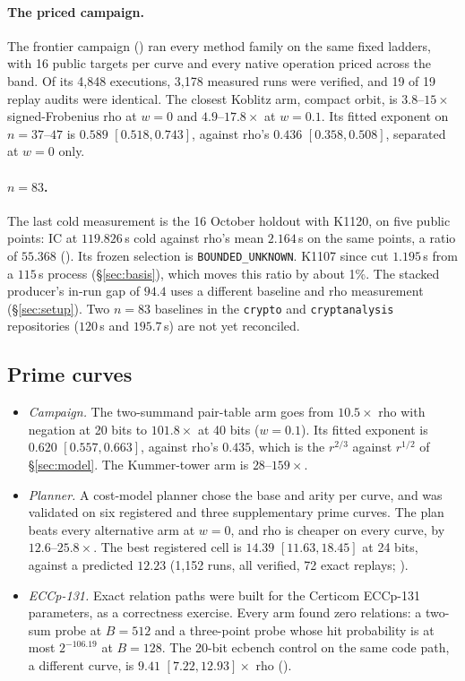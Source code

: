 \paragraph{The priced campaign.} The frontier campaign
() ran every method family on
the same fixed ladders, with 16 public targets per curve and every native
operation priced across the band. Of its 4{,}848 executions, 3{,}178
measured runs were verified, and 19 of 19 replay audits were identical. The
closest Koblitz arm, compact orbit, is $3.8$--$15\times$ signed-Frobenius
rho at $w=0$ and $4.9$--$17.8\times$ at $w=0.1$. Its fitted exponent on
$n=37$--$47$ is $0.589$ $[0.518,0.743]$, against rho's $0.436$
$[0.358,0.508]$, separated at $w=0$ only.

\paragraph{$n=83$.} The last cold measurement is the 16 October holdout
with K1120, on five public points: IC at $119.826$\,s cold against
rho's mean $2.164$\,s on the same points, a ratio of
$55.368$ (). Its frozen
selection is \texttt{BOUNDED\_UNKNOWN}. K1107 since cut $1.195$\,s from a
$115$\,s process (\S\ref{sec:basis}), which moves this ratio by about 1\%.
The stacked producer's in-run gap of $94.4$ uses a different baseline and
rho measurement (\S\ref{sec:setup}). Two $n=83$ baselines in the
\texttt{crypto} and \texttt{cryptanalysis} repositories ($120$\,s and
$195.7$\,s) are not yet reconciled.

\subsection{Prime curves}

\begin{itemize}
\item \emph{Campaign.} The two-summand pair-table arm goes from $10.5\times$
  rho with negation at 20 bits to $101.8\times$ at 40 bits ($w=0.1$). Its
  fitted exponent is $0.620$ $[0.557,0.663]$, against rho's $0.435$, which
  is the $r^{2/3}$ against $r^{1/2}$ of \S\ref{sec:model}. The Kummer-tower
  arm is $28$--$159\times$.
\item \emph{Planner.} A cost-model planner chose the base and arity per
  curve, and was validated on six registered and three supplementary prime
  curves. The plan beats every alternative arm at $w=0$, and rho is
  cheaper on every curve, by $12.6$--$25.8\times$. The best registered cell
  is $14.39$ $[11.63,18.45]$ at 24 bits, against a predicted $12.23$
  (1{,}152 runs, all verified, 72 exact replays;
  ).
\item \emph{ECCp-131.} Exact relation paths were built for the Certicom
  ECCp-131 parameters, as a correctness exercise. Every arm found zero
  relations: a two-sum probe at $B=512$ and a three-point probe whose hit
  probability is at most $2^{-106.19}$ at $B=128$. The 20-bit ecbench
  control on the same code path, a different curve, is $9.41$
  $[7.22,12.93]\times$ rho
  ().
\end{itemize}

